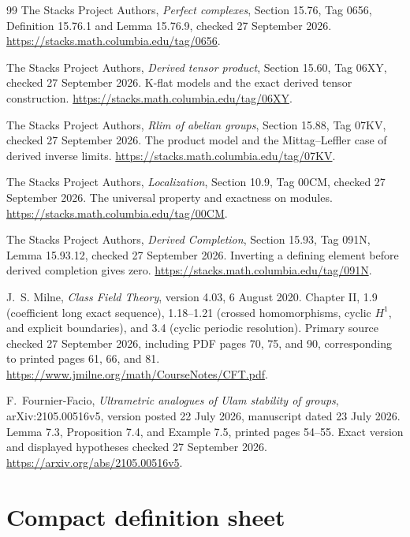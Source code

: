 \documentclass[11pt]{article}
\theoremstyle{definition}
\theoremstyle{remark}
\begin{document}
\begin{thebibliography}{99}
The Stacks Project Authors,
\emph{Perfect complexes}, Section 15.76, Tag 0656,
Definition 15.76.1 and Lemma 15.76.9, checked 27 September 2026.
\url{https://stacks.math.columbia.edu/tag/0656}.

The Stacks Project Authors,
\emph{Derived tensor product}, Section 15.60, Tag 06XY,
checked 27 September 2026. K-flat models and the exact derived tensor construction.
\url{https://stacks.math.columbia.edu/tag/06XY}.

The Stacks Project Authors,
\emph{Rlim of abelian groups}, Section 15.88, Tag 07KV,
checked 27 September 2026. The product model and the Mittag--Leffler case of derived inverse limits.
\url{https://stacks.math.columbia.edu/tag/07KV}.

The Stacks Project Authors,
\emph{Localization}, Section 10.9, Tag 00CM,
checked 27 September 2026. The universal property and exactness on modules.
\url{https://stacks.math.columbia.edu/tag/00CM}.

The Stacks Project Authors,
\emph{Derived Completion}, Section 15.93, Tag 091N,
Lemma 15.93.12, checked 27 September 2026. Inverting a defining element before derived completion gives zero.
\url{https://stacks.math.columbia.edu/tag/091N}.

J.~S. Milne, \emph{Class Field Theory}, version 4.03, 6 August 2020.
Chapter II, 1.9 (coefficient long exact sequence), 1.18--1.21 (crossed homomorphisms, cyclic $H^1$, and explicit boundaries), and 3.4 (cyclic periodic resolution). Primary source checked 27 September 2026, including PDF pages 70, 75, and 90, corresponding to printed pages 61, 66, and 81.
\url{https://www.jmilne.org/math/CourseNotes/CFT.pdf}.

F.~Fournier-Facio, \emph{Ultrametric analogues of Ulam stability of groups},
arXiv:2105.00516v5, version posted 22 July 2026, manuscript dated 23 July 2026.
Lemma 7.3, Proposition 7.4, and Example 7.5, printed pages 54--55. Exact version and displayed hypotheses checked 27 September 2026.
\url{https://arxiv.org/abs/2105.00516v5}.

\end{thebibliography}

\appendix
{}
\section{Compact definition sheet}
\end{document}
